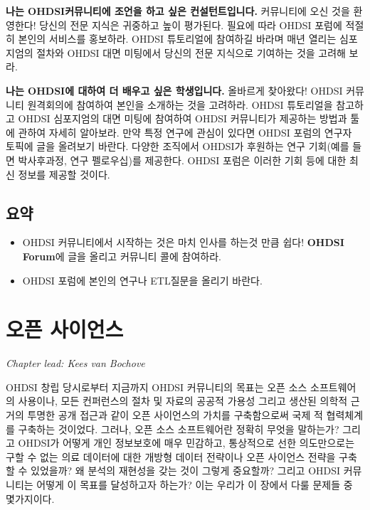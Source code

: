 \documentclass[11pt]{book}
\theoremstyle{definition}
\theoremstyle{definition}
\theoremstyle{definition}
\theoremstyle{remark}
\let\BeginKnitrBlock\begin \let\EndKnitrBlock\end
\begin{document}
\textbf{나는 OHDSI커뮤니티에 조언을 하고 싶은 컨설턴트입니다.}
커뮤니티에 오신 것을 환영한다! 당신의 전문 지식은 귀중하고 높이
평가된다. 필요에 따라 OHDSI 포럼에 적절히 본인의 서비스를 홍보하라.
OHDSI 튜토리얼에 참여하길 바라며 매년 열리는 심포지엄의 절차와 OHDSI
대면 미팅에서 당신의 전문 지식으로 기여하는 것을 고려해 보라.

\textbf{나는 OHDSI에 대하여 더 배우고 싶은 학생입니다.} 올바르게
찾아왔다! OHDSI 커뮤니티 원격회의에 참여하여 본인을 소개하는 것을
고려하라. OHDSI 튜토리얼을 참고하고 OHDSI 심포지엄의 대면 미팅에
참여하여 OHDSI 커뮤니티가 제공하는 방법과 툴에 관하여 자세히 알아보라.
만약 특정 연구에 관심이 있다면 OHDSI 포럼의 연구자 토픽에 글을 올려보기
바란다. 다양한 조직에서 OHDSI가 후원하는 연구 기회(예를 들면 박사후과정,
연구 펠로우십)를 제공한다. OHDSI 포럼은 이러한 기회 등에 대한 최신
정보를 제공할 것이다.

\section{요약}\label{-1}

\BeginKnitrBlock{rmdsummary}
\begin{itemize}
\item
  OHDSI 커뮤니티에서 시작하는 것은 마치 인사를 하는것 만큼 쉽다!
  \textbf{OHDSI Forum}에 글을 올리고 커뮤니티 콜에 참여하라.
\item
  OHDSI 포럼에 본인의 연구나 ETL질문을 올리기 바란다.
\end{itemize}
\EndKnitrBlock{rmdsummary}

\chapter{오픈 사이언스}\label{OpenScience}


\emph{Chapter lead: Kees van Bochove}

OHDSI 창립 당시로부터 지금까지 OHDSI 커뮤니티의 목표는 오픈 소스
소프트웨어의 사용이나, 모든 컨퍼런스의 절차 및 자료의 공공적 가용성
그리고 생산된 의학적 근거의 투명한 공개 접근과 같이 오픈 사이언스의
가치를 구축함으로써 국제 적 협력체계를 구축하는 것이었다. 그러나, 오픈
소스 소프트웨어란 정확히 무엇을 말하는가? 그리고 OHDSI가 어떻게 개인
정보보호에 매우 민감하고, 통상적으로 선한 의도만으로는 구할 수 없는 의료
데이터에 대한 개방형 데이터 전략이나 오픈 사이언스 전략을 구축할 수
있었을까? 왜 분석의 재현성을 갖는 것이 그렇게 중요할까? 그리고 OHDSI
커뮤니티는 어떻게 이 목표를 달성하고자 하는가? 이는 우리가 이 장에서
다룰 문제들 중 몇가지이다.
\end{document}
